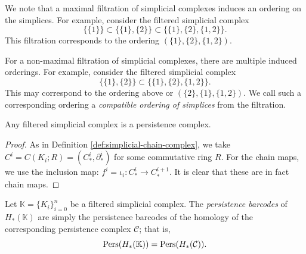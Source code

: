 We note that a maximal filtration of simplicial complexes induces an ordering on the simplices. For example, consider the filtered simplicial complex
\[\{\{1\}\} \subset \{\{1\}, \{2\}\} \subset \{\{1\}, \{2\}, \{1,2\}\}.\]
This filtration corresponds to the ordering $(\{1\}, \{2\}, \{1,2\})$.

For a non-maximal filtration of simplicial complexes, there are multiple induced orderings. For example, consider the filtered simplicial complex
\[\{\{1\}, \{2\}\} \subset \{\{1\}, \{2\}, \{1,2\}\}.\]
This may correspond to the ordering above or $(\{2\}, \{1\}, \{1,2\})$. We call such a corresponding ordering a \emph{compatible ordering of simplices} from the filtration.



\begin{lemma}
    Any filtered simplicial complex is a persistence complex.
\end{lemma}

\begin{proof}
    As in Definition \ref{def:simplicial-chain-complex}, we take $C^i = C(K_i; R) = (C^i_*, \partial^i_*)$ for some commutative ring $R$. For the chain maps, we use the inclusion map: $f^i = \iota_i: C^i_* \to C^{i+1}_*$. It is clear that these are in fact chain maps.
\end{proof}

\begin{definition}
    Let $\mathbb K = \{K_i\}_{i=0}^n$ be a filtered simplicial complex. The \emph{persistence barcodes} of $H_*(\mathbb K)$ are simply the persistence barcodes of the homology of the corresponding persistence complex $\mathcal C$; that is,
    \[ \operatorname{Pers}(H_*(\mathbb K)) = \operatorname{Pers}(H_*(\mathcal C)). \]
\end{definition}

